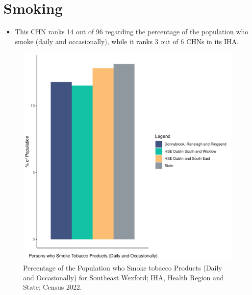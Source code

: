 \documentclass{article}
\begin{document}
\pagebreak

\section{Smoking}\label{sect:Smoking}
\begin{itemize}
\item This CHN ranks  14 out of 96 regarding the percentage of the population who smoke (daily and occasionally), while it ranks   3 out of 6 CHNs in its IHA.
\end{itemize}
\begin{figure}[H]
	\centering
	\includegraphics[width = 120mm]{../figures/SmokingED.pdf}
	\caption{Percentage of the Population who Smoke tobacco Products (Daily and Occasionally) for Southeast Wexford; IHA, Health Region and State; Census 2022.}
	\label{fig:2ae19629-1a6a-13a3-e055-000000000001}
	\end{figure}
	
\end{document}

